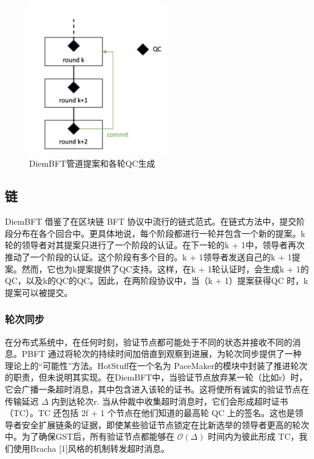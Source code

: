 \begin{figure}[htbp]
    \centering
    \includegraphics[width=6cm]{figures/image1.jpg}
    \caption{DiemBFT管道提案和各轮QC生成}
    \label{image1}
\end{figure}

\subsection{链}

DiemBFT 借鉴了在区块链 BFT 协议中流行的链式范式。在链式方法中，提交阶段分布在各个回合中。更具体地说，每个阶段都进行一轮并包含一个新的提案。k轮的领导者对其提案只进行了一个阶段的认证。在下一轮的k + 1中，领导者再次推动了一个阶段的认证。这个阶段有多个目的。k + 1领导者发送自己的k + 1提案。然而，它也为k提案提供了QC支持。这样，在k + 1轮认证时，会生成k + 1的QC，以及k的QC的QC。因此，在两阶段协议中，当（k + 1）提案获得QC 时，k提案可以被提交。

\subsubsection{轮次同步}

在分布式系统中，在任何时刻，验证节点都可能处于不同的状态并接收不同的消息。PBFT 通过将轮次的持续时间加倍直到观察到进展，为轮次同步提供了一种理论上的“可能性”方法。HotStuff在一个名为 PaceMaker的模块中封装了推进轮次的职责，但未说明其实现。在DiemBFT中，当验证节点放弃某一轮（比如r）时，它会广播一条超时消息，其中包含进入该轮的证书。这将使所有诚实的验证节点在传输延迟 $\Delta$ 内到达轮次r. 当从仲裁中收集超时消息时，它们会形成超时证书（TC）。TC 还包括 2f + 1 个节点在他们知道的最高轮 QC 上的签名。这也是领导者安全扩展链条的证据，即使某些验证节点锁定在比新选举的领导者更高的轮次中。为了确保GST后，所有验证节点都能够在 $\mathcal{O}(\Delta)$ 时间内为彼此形成 TC，我们使用Bracha [1]风格的机制转发超时消息。